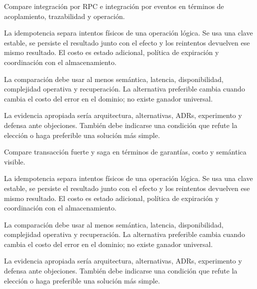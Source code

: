 \documentclass[variant=guia,cover=institutional,mode=screen]{ua-engineering-v6-article}
\begin{document}
\begin{uaexercise}
Compare integración por RPC e integración por eventos en términos de acoplamiento, trazabilidad y operación.
\end{uaexercise}
\begin{uaanswer}
La idempotencia separa intentos físicos de una operación lógica. Se usa una clave estable, se persiste el resultado junto con el efecto y los reintentos devuelven ese mismo resultado. El costo es estado adicional, política de expiración y coordinación con el almacenamiento.

La comparación debe usar al menos semántica, latencia, disponibilidad, complejidad operativa y recuperación. La alternativa preferible cambia cuando cambia el costo del error en el dominio; no existe ganador universal.

La evidencia apropiada sería arquitectura, alternativas, ADRs, experimento y defensa ante objeciones. También debe indicarse una condición que refute la elección o haga preferible una solución más simple.
\end{uaanswer}

\begin{uaexercise}
Compare transacción fuerte y saga en términos de garantías, costo y semántica visible.
\end{uaexercise}
\begin{uaanswer}
La idempotencia separa intentos físicos de una operación lógica. Se usa una clave estable, se persiste el resultado junto con el efecto y los reintentos devuelven ese mismo resultado. El costo es estado adicional, política de expiración y coordinación con el almacenamiento.

La comparación debe usar al menos semántica, latencia, disponibilidad, complejidad operativa y recuperación. La alternativa preferible cambia cuando cambia el costo del error en el dominio; no existe ganador universal.

La evidencia apropiada sería arquitectura, alternativas, ADRs, experimento y defensa ante objeciones. También debe indicarse una condición que refute la elección o haga preferible una solución más simple.
\end{uaanswer}
\end{document}
